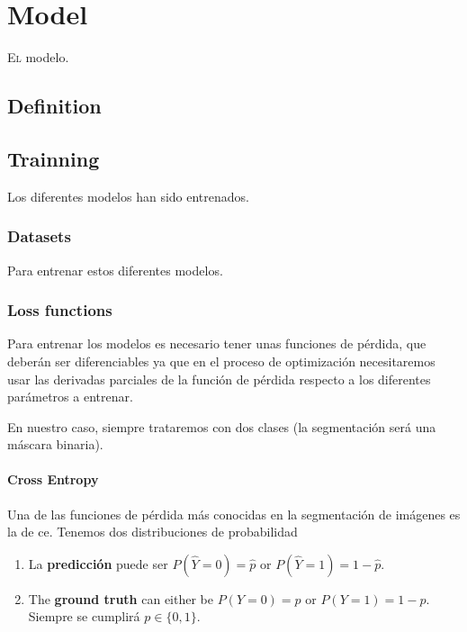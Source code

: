 

\chapter{Model} \label{cha:model}



\lettrine{E}{l} modelo.


\section{Definition}


\section{Trainning}

Los diferentes modelos han sido entrenados.

\subsection{Datasets}

Para entrenar estos diferentes modelos.

\subsection{Loss functions}

Para entrenar los modelos es necesario tener unas funciones de pérdida, que
deberán ser diferenciables ya que en el proceso de optimización necesitaremos
usar las derivadas parciales de la función de pérdida respecto a los diferentes
parámetros a entrenar.

En nuestro caso, siempre trataremos con dos clases (la segmentación será una
máscara binaria).

\subsubsection{Cross Entropy}
Una de las funciones de pérdida más conocidas en la segmentación de imágenes es
la de \gls{ce}. Tenemos dos distribuciones de probabilidad

\begin{enumerate}
  \item La \textbf{predicción} puede ser \(P(\hat{Y} = 0) = \hat{p}\) or
  \(P(\hat{Y} = 1) = 1 - \hat{p}\).
  \item The \textbf{ground truth} can either be \(P(Y = 0) = p\) or
  \(P(Y = 1) = 1 - p\). Siempre se cumplirá \(p \in \{0, 1\}\).
\end{enumerate}

